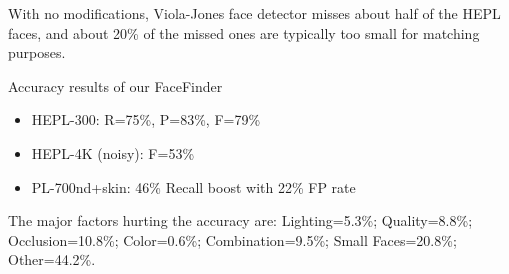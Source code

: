 
\begin{xpsectionbox}{}{}
With no modifications, Viola-Jones face detector misses about half of the HEPL faces, and about 20\% of the missed ones are typically too small for matching purposes.

Accuracy results of our FaceFinder
\begin{itemize}
	\item HEPL-300: R=75\%, P=83\%, F=79\%
	\item HEPL-4K (noisy): F=53\%
	\item PL-700nd+skin: 46\% Recall boost with 22\% FP rate
\end{itemize}
The major factors hurting the accuracy are: Lighting=5.3\%; Quality=8.8\%; Occlusion=10.8\%; Color=0.6\%; Combination=9.5\%; Small Faces=20.8\%; Other=44.2\%.
\end{xpsectionbox}


